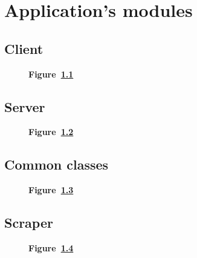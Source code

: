 \chapter{Application's modules}\label{ch:modules}

\begin{landscape}
	\section{Client}\label{sec:client}

	\begin{figure}[!h]
		\caption*{\textbf{Figure~\ref{fig:client}}}
		\captionlistentry{}
		\label{fig:client}
	\end{figure}
\end{landscape}

\begin{landscape}
	\section{Server}\label{sec:server}

	\begin{figure}[!h]
		\caption*{\textbf{Figure~\ref{fig:server}}}
		\captionlistentry{}
		\label{fig:server}
	\end{figure}
\end{landscape}

\begin{landscape}
	\section{Common classes}\label{sec:common}

	\begin{figure}[!h]
		\caption*{\textbf{Figure~\ref{fig:common}}}
		\captionlistentry{}
		\label{fig:common}
	\end{figure}
\end{landscape}

\begin{landscape}
	\section{Scraper}\label{sec:scraper}

	\begin{figure}[!h]
		\caption*{\textbf{Figure~\ref{fig:scraper}}}
		\captionlistentry{}
		\label{fig:scraper}
	\end{figure}
\end{landscape}
